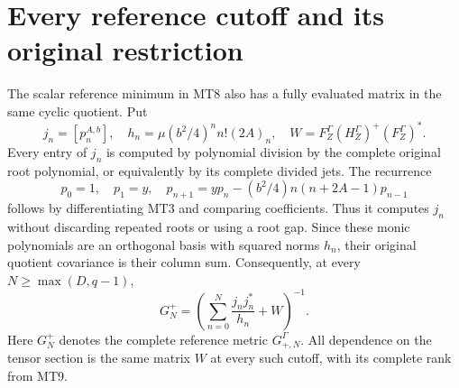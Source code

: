 \documentclass[11pt]{article}
\begin{document}
\section{Every reference cutoff and its original restriction}
The scalar reference minimum in MT8 also has a fully evaluated matrix
in the same cyclic quotient. Put
\begin{equation}\tag{MT12}
 j_n=[p_n^{A,b}],\quad h_n=\mu(b^2/4)^n n!(2A)_n,\quad
 W=F_Z^\Gamma(H_Z^\Gamma)^+(F_Z^\Gamma)^*.
\end{equation}
Every entry of $j_n$ is computed by polynomial division by the complete
original root polynomial, or equivalently by its complete divided jets.
The recurrence
\[
 p_0=1,\quad p_1=y,\quad
 p_{n+1}=yp_n-(b^2/4)n(n+2A-1)p_{n-1}
\]
follows by differentiating MT3 and comparing coefficients. Thus it
computes $j_n$ without discarding repeated roots or using a root gap.
Since these monic polynomials are an orthogonal basis with squared
norms $h_n$, their original quotient covariance is their column sum.
Consequently, at every $N\ge\max(D,q-1)$,
\begin{equation}\tag{MT13}\boxed{
 G_N^+=\left(\sum_{n=0}^N\frac{j_nj_n^*}{h_n}+W\right)^{-1}.}
\end{equation}
Here $G_N^+$ denotes the complete reference metric $G^\Gamma_{+,N}$.
All dependence on the tensor section is the same matrix $W$ at every
such cutoff, with its complete rank from MT9.
\end{document}
